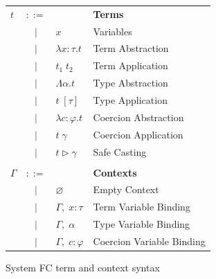 \documentclass{sig-alternate}
\begin{document}
\begin{figure}[h!]
\begin{tabular}{lcll}
$t$ & $::=$ & & \textbf{Terms} \\
    & $|$   & $x$ & {\small Variables} \\
    & $|$   & $\lambda x:\tau.t$ & {\small Term Abstraction} \\
    & $|$   & $t_1\; t_2$ & {\small Term Application} \\
    & $|$   & $\Lambda \alpha.t$ & {\small Type Abstraction} \\
    & $|$   & $t\; [\tau]$ & {\small Type Application} \\
    & $|$   & $\lambda c:\varphi.t$ & {\small Coercion Abstraction} \\
    & $|$   & $t\; \gamma$ & {\small Coercion Application} \\
    & $|$   & $t \triangleright \gamma$ & {\small Safe Casting} \\
&&\; \hspace{.75in} \;& \\
$\Gamma$ & $::=$ & & \textbf{Contexts} \\
         & $|$   & $\varnothing$ & {\small Empty Context} \\
         & $|$   & $\Gamma,\; x:\tau$ & {\small Term Variable Binding} \\
         & $|$   & $\Gamma,\; \alpha$ & {\small Type Variable Binding} \\
         & $|$   & $\Gamma,\; c:\varphi$ & {\small Coercion Variable Binding}
\end{tabular}
\caption{System FC term and context syntax}
\label{fig:syntax-tex}
\end{figure}
\end{document}
